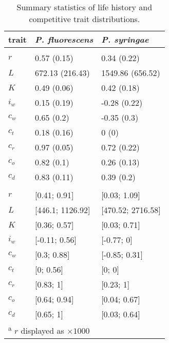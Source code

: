 \begin{table}[!ht]

\caption{\label{tab:}Summary statistics of life history and competitive trait distributions.}
\centering
\begin{tabular}[t]{lll}
\toprule
trait & \textit{P. fluorescens} & \textit{P. syringae}\\
\midrule
\addlinespace[0.3em]
\multicolumn{3}{l}{\textbf{$\mu (\sigma)$}}\\
\hspace{1em}$r$ & 0.57 (0.15) & 0.34 (0.22)\\
\hspace{1em}$L$ & 672.13 (216.43) & 1549.86 (656.52)\\
\hspace{1em}$K$ & 0.49 (0.06) & 0.42 (0.18)\\
\hspace{1em}$i_w$ & 0.15 (0.19) & -0.28 (0.22)\\
\hspace{1em}$c_w$ & 0.65 (0.2) & -0.35 (0.3)\\
\hspace{1em}$c_t$ & 0.18 (0.16) & 0 (0)\\
\hspace{1em}$c_r$ & 0.97 (0.05) & 0.72 (0.22)\\
\hspace{1em}$c_o$ & 0.82 (0.1) & 0.26 (0.13)\\
\hspace{1em}$c_d$ & 0.83 (0.11) & 0.39 (0.2)\\
\addlinespace[0.3em]
\multicolumn{3}{l}{\textbf{\texttt{[min; max]}}}\\
\hspace{1em}$r$ & [0.41; 0.91] & [0.03; 1.09]\\
\hspace{1em}$L$ & [446.1; 1126.92] & [470.52; 2716.58]\\
\hspace{1em}$K$ & [0.36; 0.57] & [0.03; 0.71]\\
\hspace{1em}$i_w$ & [-0.11; 0.56] & [-0.77; 0]\\
\hspace{1em}$c_w$ & [0.3; 0.88] & [-0.85; 0.31]\\
\hspace{1em}$c_t$ & [0; 0.56] & [0; 0]\\
\hspace{1em}$c_r$ & [0.83; 1] & [0.23; 1]\\
\hspace{1em}$c_o$ & [0.64; 0.94] & [0.04; 0.67]\\
\hspace{1em}$c_d$ & [0.65; 1] & [0.03; 0.64]\\
\bottomrule
\multicolumn{3}{l}{\textsuperscript{a} $r$ displayed as $\times 1000$}\\
\end{tabular}
\end{table}
